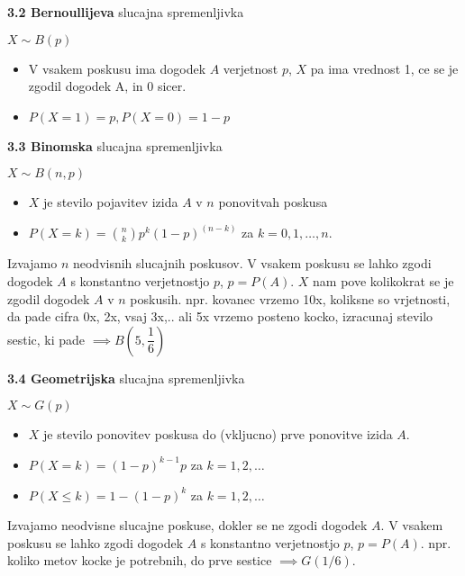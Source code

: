 \documentclass{article}
\begin{document}
\begin{multicols}{3}
\textbf{3.2 Bernoullijeva} slucajna spremenljivka
\begin{center}
    \begin{math}
        X \sim B(p)
    \end{math}
\end{center}
\begin{itemize}
    \item V vsakem poskusu ima dogodek $A$ verjetnost $p$, $X$ pa ima vrednost 1, ce se je zgodil dogodek A, in 0 sicer.
    \item $P(X = 1) = p, P(X = 0) = 1 - p$
\end{itemize}


\textbf{3.3 Binomska} slucajna spremenljivka
\begin{center}
    \begin{math}
        X \sim B(n, p)
    \end{math}
\end{center}
\begin{itemize}
    \item $X$ je stevilo pojavitev izida $A$ v $n$ ponovitvah poskusa
    \item $P(X = k) = {n \choose k} p^{k} (1 - p)^{(n - k)}$ za $k = 0,1, \dots, n.$
\end{itemize}
Izvajamo $n$ neodvisnih slucajnih poskusov. V vsakem poskusu se lahko zgodi dogodek $A$ s 
konstantno verjetnostjo $p$, $p =  P(A)$. 
$X$ nam pove kolikokrat se je zgodil dogodek $A$ v $n$ poskusih.
npr. kovanec vrzemo 10x, koliksne so vrjetnosti, da pade cifra 0x, 2x, vsaj 3x,..
ali 5x vrzemo posteno kocko, izracunaj stevilo sestic, ki pade $\implies B(5, \dfrac{1}{6})$

\textbf{3.4 Geometrijska} slucajna spremenljivka
\begin{center}
    \begin{math}
        X \sim G(p)
    \end{math}
\end{center}
\begin{itemize}
    \item $X$ je stevilo ponovitev poskusa do (vkljucno) prve ponovitve izida $A$.
    \item $P(X = k) = (1 - p)^{k - 1} p$ za $k = 1,2, \dots$ 
    \item $P(X \leq k) = 1 - (1 - p)^{k}$ za $k = 1,2, \dots$
\end{itemize}
Izvajamo  neodvisne slucajne poskuse, dokler se ne zgodi dogodek $A$. V vsakem poskusu
se lahko zgodi dogodek $A$  s konstantno verjetnostjo $p$, $p =  P(A)$.
npr. koliko metov kocke je potrebnih, do prve sestice $\implies G(1/6)$.


\end{multicols}
\end{document}
